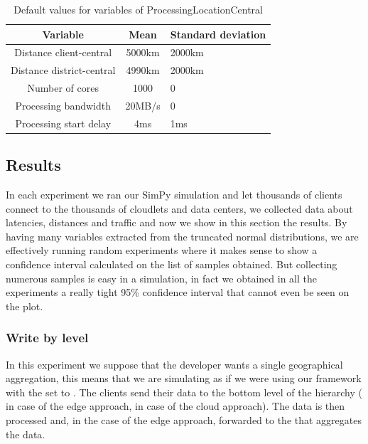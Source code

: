 \begin{table}[H]
\centering
\begin{tabular}{|c|c|l|}
\rowcolor{bluepoli!40} %
\hline
\textbf{Variable}           & \textbf{Mean}   & \textbf{Standard deviation}   \\ \hline \hline
Distance client-central     & 5000km          & 2000km                        \\ \hline
Distance district-central   & 4990km          & 2000km                        \\ \hline
Number of cores             & 1000            & 0                             \\ \hline
Processing bandwidth        & 20MB/s          & 0                             \\ \hline
Processing start delay      & 4ms             & 1ms                           \\ \hline
\end{tabular}
\caption{Default values for variables of ProcessingLocationCentral}
\label{tab:default_setting_central}
\end{table}


\subsection{Results}
In each experiment we ran our SimPy simulation and let thousands of clients connect to the thousands of cloudlets and data centers, we collected data about latencies, distances and traffic and now we show in this section the results.
By having many variables extracted from the truncated normal distributions, we are effectively running random experiments where it makes sense to show a confidence interval calculated on the list of samples obtained. But collecting numerous samples is easy in a simulation, in fact we obtained in all the experiments a really tight 95\% confidence interval that cannot even be seen on the plot.


\subsubsection{Write by level}
In this experiment we suppose that the developer wants a single geographical aggregation, this means that we are simulating as if we were using our framework with the  set to .
The clients send their data to the bottom level of the hierarchy ( in case of the edge approach,  in case of the cloud approach). The data is then processed and, in the case of the edge approach, forwarded to the  that aggregates the data.

